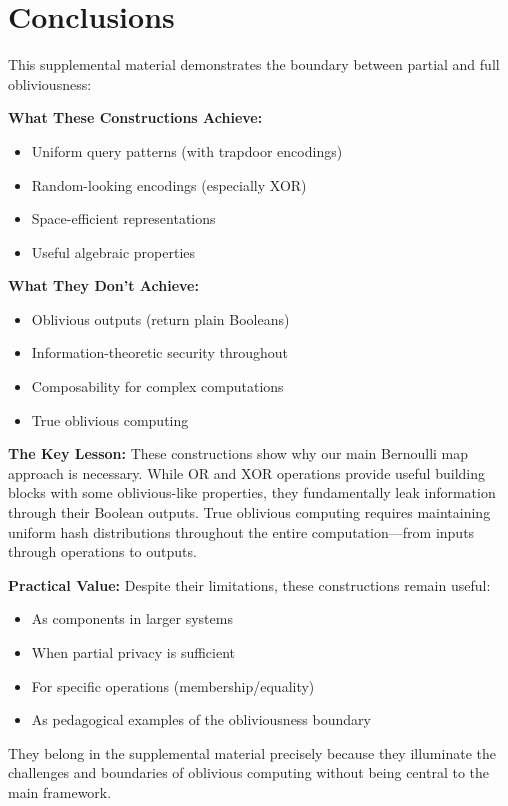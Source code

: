 \documentclass[11pt,final]{article}
\begin{document}
\section{Conclusions}

This supplemental material demonstrates the boundary between partial and full obliviousness:

\textbf{What These Constructions Achieve:}
\begin{itemize}
    \item Uniform query patterns (with trapdoor encodings)
    \item Random-looking encodings (especially XOR)
    \item Space-efficient representations
    \item Useful algebraic properties
\end{itemize}

\textbf{What They Don't Achieve:}
\begin{itemize}
    \item Oblivious outputs (return plain Booleans)
    \item Information-theoretic security throughout
    \item Composability for complex computations
    \item True oblivious computing
\end{itemize}

\textbf{The Key Lesson:}
These constructions show why our main Bernoulli map approach is necessary. While OR and XOR operations provide useful building blocks with some oblivious-like properties, they fundamentally leak information through their Boolean outputs. True oblivious computing requires maintaining uniform hash distributions throughout the entire computation—from inputs through operations to outputs.

\textbf{Practical Value:}
Despite their limitations, these constructions remain useful:
\begin{itemize}
    \item As components in larger systems
    \item When partial privacy is sufficient
    \item For specific operations (membership/equality)
    \item As pedagogical examples of the obliviousness boundary
\end{itemize}

They belong in the supplemental material precisely because they illuminate the challenges and boundaries of oblivious computing without being central to the main framework.


\end{document}
